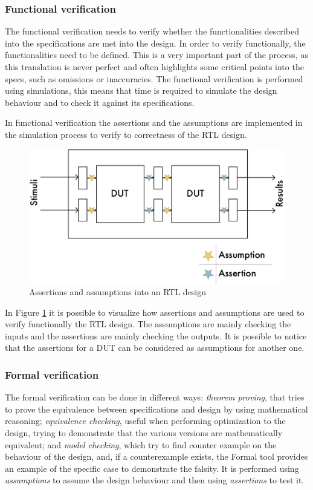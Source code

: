 \subsubsection{Functional verification}
The functional verification needs to verify whether the functionalities described into the specifications are met into the design. In order to verify functionally, the functionalities need to be defined. This is a very important part of the process, as this translation is never perfect and often highlights some critical points into the specs, such as omissions or inaccuracies. The functional verification is performed using simulations, this means that time is required to simulate the design behaviour and to check it against its specifications.

In functional verification the assertions and the assumptions are implemented in the simulation process to verify to correctness of the RTL design.


\begin{figure}[H]
    \centering
    \includegraphics[scale = 0.55]{Chapter_1/img/ass-ass.png}
    \caption{Assertions and assumptions into an RTL design}
    \label{ass-ass}
\end{figure}

In Figure \ref{ass-ass} it is possible to visualize how assertions and assumptions are used to verify functionally the RTL design.
The assumptions are mainly checking the inputs and the assertions are mainly checking the outputs. It is possible to notice that the assertions for a DUT can be considered as assumptions for another one.

\subsubsection{Formal verification}
The formal verification can be done in different ways: \textit{theorem proving}, that tries to prove the equivalence between specifications and design by using mathematical reasoning; \textit{equivalence checking}, useful when performing optimization to the design, trying to demonstrate that the various versions are mathematically equivalent; and \textit{model checking}, which try to find counter example on the behaviour of the design, and, if a counterexample exists, the Formal tool provides an example of the specific case to demonstrate the falsity. It is performed using \emph{assumptions} to assume the design behaviour and then using \emph{assertions} to test it.


